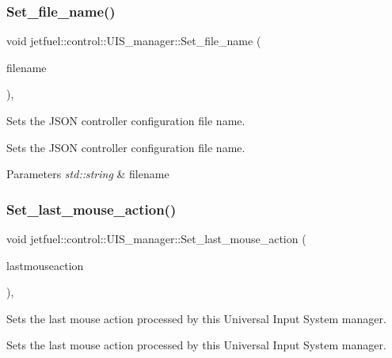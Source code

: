 \subsubsection{\texorpdfstring{Set\+\_\+file\+\_\+name()}{Set\_file\_name()}}
{\footnotesize\ttfamily void jetfuel\+::control\+::\+U\+I\+S\+\_\+manager\+::\+Set\+\_\+file\+\_\+name (\begin{DoxyParamCaption}\item[{const std\+::string}]{filename }\end{DoxyParamCaption})\hspace{0.3cm}{\ttfamily [inline]}, {\ttfamily [protected]}}



Sets the J\+S\+ON controller configuration file name. 

Sets the J\+S\+ON controller configuration file name.


\begin{DoxyParams}{Parameters}
{\em std\+::string} & filename \\
\hline
\end{DoxyParams}
\mbox{\label{classjetfuel_1_1control_1_1UIS__manager_aa9fc7545ca5bcc229567f86945e981cd}} 
\subsubsection{\texorpdfstring{Set\+\_\+last\+\_\+mouse\+\_\+action()}{Set\_last\_mouse\_action()}}
{\footnotesize\ttfamily void jetfuel\+::control\+::\+U\+I\+S\+\_\+manager\+::\+Set\+\_\+last\+\_\+mouse\+\_\+action (\begin{DoxyParamCaption}\item[{const std\+::string}]{lastmouseaction }\end{DoxyParamCaption})\hspace{0.3cm}{\ttfamily [inline]}, {\ttfamily [protected]}}



Sets the last mouse action processed by this Universal Input System manager. 

Sets the last mouse action processed by this Universal Input System manager.


